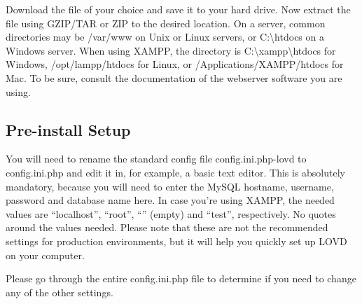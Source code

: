 \documentclass[a4paper,oneside,openany,12pt]{memoir}
\begin{document}
Download the file of your choice and save it to your hard drive.
Now extract the file using GZIP/TAR or ZIP to the desired location.
On a server, common directories may be /var/www on Unix or Linux servers, or C:\textbackslash{}htdocs on a Windows server.
When using XAMPP, the directory is C:\textbackslash{}xampp\textbackslash{}htdocs for Windows, /opt/lampp/htdocs for Linux, or /Applications/XAMPP/htdocs for Mac.
To be sure, consult the documentation of the webserver software you are using.



\subsection{Pre-install Setup}
You will need to rename the standard config file config.ini.php-lovd to config.ini.php and edit it in, for example, a basic text editor.
This is absolutely mandatory, because you will need to enter the MySQL hostname, username, password and database name here.
In case you're using XAMPP, the needed values are ``localhost'', ``root'', ``'' (empty) and ``test'', respectively. No quotes around the values needed.
Please note that these are not the recommended settings for production environments, but it will help you quickly set up LOVD on your computer.

Please go through the entire config.ini.php file to determine if you need to change any of the other settings.
\end{document}
